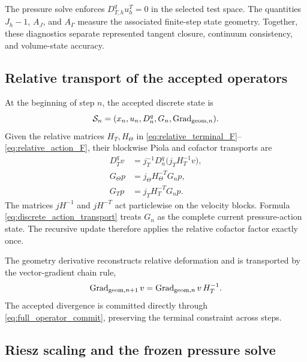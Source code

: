 \documentclass[11pt]{article}
\theoremstyle{plain}
\theoremstyle{definition}
\theoremstyle{remark}
\newcommand{\Grad}{\operatorname{Grad}}
\newcommand{\Th}{\Theta}
\begin{document}
The pressure solve enforces $D_{T,h}^qu_h^T=0$ in the selected test space.
The quantities $J_h-1$, $A_J$, and $A_\Gamma$ measure the associated
finite-step state geometry.  Together, these diagnostics separate represented
tangent closure, continuum consistency, and volume-state accuracy.

\subsection{Relative transport of the accepted operators}

At the beginning of step $n$, the accepted discrete state is
\begin{equation}
  \mathcal S_n=(x_n,u_n,D_n^q,G_n,\Grad_{{\rm geom},n}).
  \label{eq:production_state}
\end{equation}
Given the relative matrices $H_T,H_\Th$ in
\eqref{eq:relative_terminal_F}--\eqref{eq:relative_action_F}, their blockwise
Piola and cofactor transports are
\begin{align}
 D_T^qv
 &=j_T^{-1}D_n^q\bigl(j_TH_T^{-1}v\bigr),
 \label{eq:discrete_divergence_transport}\\
 G_\Th p
 &=j_\Th H_\Th^{-T}G_np,
 \label{eq:discrete_action_transport}\\
 G_Tp
 &=j_TH_T^{-T}G_np.
 \label{eq:discrete_terminal_action_transport}
\end{align}
The matrices $jH^{-1}$ and $jH^{-T}$ act particlewise on the velocity
blocks.  Formula \eqref{eq:discrete_action_transport} treats $G_n$ as the
complete current pressure-action state.  The recursive update therefore
applies the relative cofactor factor exactly once.

The geometry derivative reconstructs relative deformation and is transported
by the vector-gradient
chain rule,
\begin{equation}
 \Grad_{{\rm geom},n+1}v
 =\Grad_{{\rm geom},n}v\,H_T^{-1}.
 \label{eq:geometry_gradient_transport}
\end{equation}
The accepted divergence is committed directly through
\eqref{eq:full_operator_commit}, preserving the terminal constraint across
steps.

\subsection{Riesz scaling and the frozen pressure solve}
\end{document}
